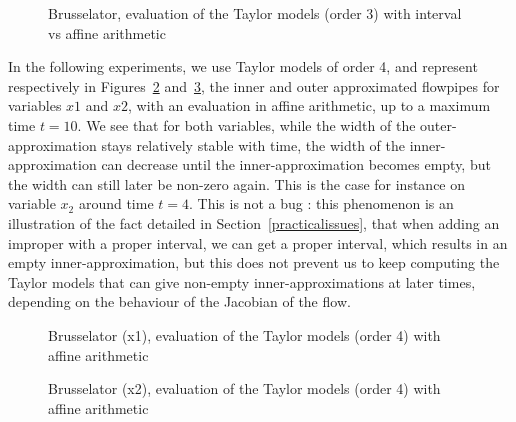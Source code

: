 \begin{figure}[htbp]
\begin{center}
\end{center}
\caption{Brusselator, evaluation of the Taylor models (order 3) with interval vs affine arithmetic \label{fig:brusselator_order3_t1}}
\end{figure}

In the following experiments, we use Taylor models of order 4, and represent respectively in Figures~\ref{fig:brusselator_order4_x1_t10} and~\ref{fig:brusselator_order4_x2_t10}, the inner and outer approximated flowpipes for variables $x1$ and $x2$, with an evaluation in affine arithmetic, up to a maximum time $t=10$. We see that for both variables, while the width of the outer-approximation stays relatively stable with time, the width of the inner-approximation can decrease until the inner-approximation becomes empty, but the width can still later be non-zero again. This is the case for instance on variable $x_2$ around time $t=4$. 
This is not a bug : this phenomenon is an illustration of the fact detailed in Section~\ref{practicalissues}, that when adding an improper with a proper interval, we can get a proper interval, which results in an empty inner-approximation, but this does not prevent us to keep computing the Taylor models that can give non-empty inner-approximations at later times, depending on the behaviour of the Jacobian of the flow.    

\begin{figure}[htbp]
\begin{center}
\end{center}
\caption{Brusselator (x1), evaluation of the Taylor models (order 4) with affine arithmetic \label{fig:brusselator_order4_x1_t10}}
\end{figure}

\begin{figure}[htbp]
\begin{center}
\end{center}
\caption{Brusselator (x2), evaluation of the Taylor models (order 4) with affine arithmetic \label{fig:brusselator_order4_x2_t10}}
\end{figure}

